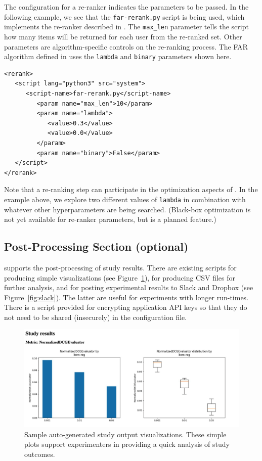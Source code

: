 The configuration for a re-ranker indicates the parameters to be passed. In the following example, we see that the \texttt{far-rerank.py} script is being used, which implements the re-ranker described in \cite{liu2019farpfar}. The \texttt{max\_len} parameter tells the script how many items will be returned for each user from the re-ranked set. Other parameters are algorithm-specific controls on the re-ranking process. The FAR algorithm defined in \cite{liu2019farpfar} uses the \texttt{lambda} and \texttt{binary} parameters shown here.

{\small
\begin{verbatim}
<rerank>
   <script lang="python3" src="system">
      <script-name>far-rerank.py</script-name>
         <param name="max_len">10</param>
         <param name="lambda">
            <value>0.3</value>
            <value>0.0</value>
         </param>
         <param name="binary">False</param>
   </script>
</rerank>
\end{verbatim}}

Note that a re-ranking step can participate in the optimization aspects of \libauto{}. In the example above, we explore two different values of \texttt{lambda} in combination with whatever other hyperparameters are being searched. (Black-box optimization is not yet available for re-ranker parameters, but is a planned feature.)

\subsection{Post-Processing Section (optional)}
\libauto{} supports the post-processing of study results. There are existing scripts for producing simple visualizations (see Figure~\ref{fig:viz}), for producing CSV files for further analysis, and for posting experimental results to Slack and Dropbox (see Figure~\ref{fig:slack}). The latter are useful for experiments with longer run-times. There is a script provided for encrypting application API keys so that they do not need to be shared (insecurely) in the configuration file. 

\begin{figure}[ht!]
    \centering
    \includegraphics[width=0.8\linewidth]{imgs/la/sample-output.png}
    \caption{Sample auto-generated study output visualizations. These simple plots support experimenters in providing a quick analysis of study outcomes.}
    \label{fig:viz}
    \vspace{-0.15in}
\end{figure}


